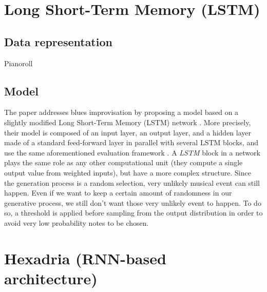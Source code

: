 \documentclass{report}
\begin{document}
\section{Long Short-Term Memory (LSTM)}
\subsection{Data representation}
Pianoroll
\subsection{Model}
The paper \cite{eck2008learning} addresses blues improvisation by proposing a model based on a slightly modified Long Short-Term Memory (LSTM) network \cite{eck2002finding}. More precisely, their model is composed of an input layer, an output layer, and a hidden layer made of a standard feed-forward layer in parallel with several LSTM blocks, and use the same aforementioned evaluation framework \cite{DBLP:journals/corr/LiuR14a}.
A \textit{LSTM} block in a network plays the same role as any other computational unit (they compute a single output value from weighted inputs), but have a more complex structure.
Since the generation process is a random selection, very unlikely musical event can still happen. Even if we want to keep a certain amount of randomness in our generative process, we still don't want those very unlikely event to happen. To do so, a threshold is applied before sampling from the output distribution in order to avoid very low probability notes to be chosen.

\section{Hexadria (RNN-based architecture)}
\end{document}
